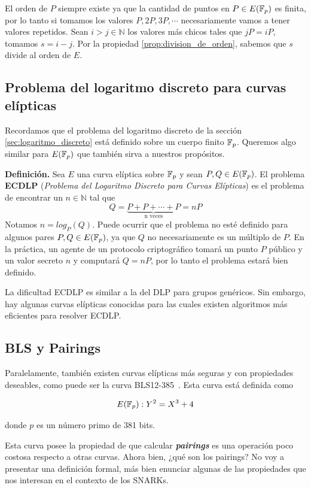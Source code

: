 El orden de $P$ siempre existe ya que la cantidad de puntos en $P\in E(\mathbb{F}_p)$ es finita, por lo tanto si tomamos los valores $P, 2P, 3P, \cdots $ necesariamente vamos a tener valores repetidos. Sean $i>j \in \mathbb{N}$ los valores más chicos tales que $jP = iP$, tomamos $s=i-j$. Por la propiedad \ref{prop:division_de_orden}, sabemos que $s$ divide al orden de $E$.


\subsection{Problema del logaritmo discreto para curvas elípticas} \label{sec:ecdlp}
Recordamos que el problema del logaritmo discreto de la sección \ref{sec:logaritmo_discreto} está definido sobre un cuerpo finito $\mathbb{F}_p$. Queremos algo similar para $E(\mathbb{F}_p)$ que también sirva a nuestros propósitos.

\vspace{1em}

\textbf{Definición.} Sea $E$ una curva elíptica sobre $\mathbb{F}_p$ y sean $P,Q\in E(\mathbb{F}_p)$. El problema \textbf{ECDLP} (\textit{Problema del Logaritmo Discreto para Curvas Elípticas}) es el problema de encontrar un $n\in\mathbb{N}$ tal que 
$$Q = \underbrace{P+P+\cdots+P}_{\text{n veces}} = nP$$
Notamos $n = log_P(Q)$. Puede ocurrir que el problema no esté definido para algunos pares $P,Q\in E(\mathbb{F}_p)$, ya que $Q$ no necesariamente es un múltiplo de $P$. En la práctica, un agente de un protocolo criptográfico tomará un punto $P$ público y un valor secreto $n$ y computará $Q = nP$, por lo tanto el problema estará bien definido. 

La dificultad ECDLP es similar a la del DLP para grupos genéricos. Sin embargo, hay algunas curvas elípticas conocidas para las cuales existen algoritmos más eficientes para resolver ECDLP.

\subsection{BLS y Pairings}
Paralelamente, también existen curvas elípticas más seguras y con propiedades deseables, como puede ser la curva BLS12-385~\cite{Short_Signatures_from_the_Weil_Pairing}. Esta curva está definida como

$$E(\mathbb{F}_p): Y^2=X^3+4$$

\noindent donde $p$ es un número primo de 381 bits.

Esta curva posee la propiedad de que calcular \textbf{\textit{pairings}}\cite{galbraith2008pairings} es una operación poco costosa respecto a otras curvas. Ahora bien, ¿qué son los pairings? No voy a presentar una definición formal, más bien enunciar algunas de las propiedades que nos interesan en el contexto de los SNARKs.

